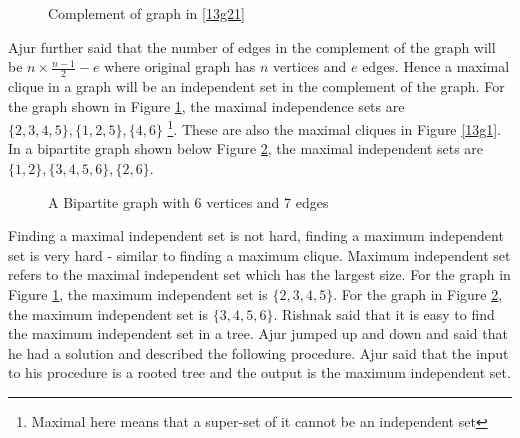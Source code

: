 \begin{figure}
\begin{center}
\caption{ Complement of graph in \ref{13g21}}\label{13g2}
\end{center}
\end{figure}

Ajur further said that the number of edges in the complement of the graph will be $n\times\frac{n-1}{2}-e$ where original graph has $n$ 
vertices and $e$ edges. Hence a maximal clique in a graph will be an independent set in the 
complement of the graph. For the graph shown in Figure \ref{13g2}, the maximal independence sets are $\{2,3,4,5\}, \{1,2,5\}, \{4,6\}$ \footnote{Maximal here means that a super-set of it cannot be an independent set}. 
These are also the maximal cliques in Figure \ref{13g1}. In a bipartite graph shown below Figure \ref{13g3}, the maximal independent sets are $\{1,2\}, \{3,4,5,6\}, \{2,6\}$.

\begin{figure}
\begin{center}
\caption{ A Bipartite graph with 6 vertices and 7 edges}\label{13g3}
\end{center}
\end{figure}

Finding a maximal independent set is not hard, finding a maximum independent set is very hard - similar to finding a maximum clique. Maximum independent set refers to the maximal independent set which has the largest size. For the graph in Figure \ref{13g2}, the maximum independent set is $\{2,3,4,5\}$. For the graph in Figure \ref{13g3}, the maximum independent set is $\{3,4,5,6\}$.  Rishnak said that it is easy to find the maximum independent set in a tree. Ajur jumped up and down and said that he had a solution and described the following procedure. Ajur said that the input to his procedure is a rooted tree and the output is the maximum independent set.

